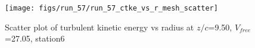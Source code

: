 \begin{figure}[H]
\centering
\texttt{[image: figs/run\_57/run\_57\_ctke\_vs\_r\_mesh\_scatter]}
\caption{Scatter plot of turbulent kinetic energy vs radius at $z/c$=9.50, $V_{free}$=27.05, station6}
\label{fig:run_57_ctke_vs_r_mesh_scatter}
\end{figure}


